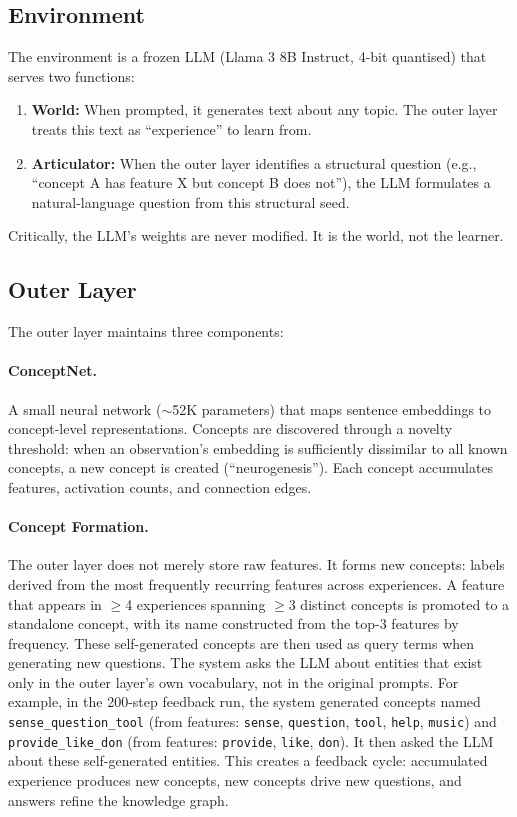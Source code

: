 \documentclass[conference]{IEEEtran}
\begin{document}
\subsection{Environment}

The environment is a frozen LLM (Llama 3 8B Instruct, 4-bit quantised) that serves two functions:

\begin{enumerate}[leftmargin=*]
\item \textbf{World:} When prompted, it generates text about any topic. The outer layer treats this text as ``experience'' to learn from.
\item \textbf{Articulator:} When the outer layer identifies a structural question (e.g., ``concept A has feature X but concept B does not''), the LLM formulates a natural-language question from this structural seed.
\end{enumerate}

Critically, the LLM's weights are never modified. It is the world, not the learner.

\subsection{Outer Layer}

The outer layer maintains three components:

\paragraph{ConceptNet.} A small neural network ($\sim$52K parameters) that maps sentence embeddings to concept-level representations. Concepts are discovered through a novelty threshold: when an observation's embedding is sufficiently dissimilar to all known concepts, a new concept is created (``neurogenesis''). Each concept accumulates features, activation counts, and connection edges.

\paragraph{Concept Formation.} The outer layer does not merely store raw features. It forms new concepts: labels derived from the most frequently recurring features across experiences. A feature that appears in $\geq$4 experiences spanning $\geq$3 distinct concepts is promoted to a standalone concept, with its name constructed from the top-3 features by frequency. These self-generated concepts are then used as query terms when generating new questions. The system asks the LLM about entities that exist only in the outer layer's own vocabulary, not in the original prompts. For example, in the 200-step feedback run, the system generated concepts named \texttt{sense\_question\_tool} (from features: \texttt{sense}, \texttt{question}, \texttt{tool}, \texttt{help}, \texttt{music}) and \texttt{provide\_like\_don} (from features: \texttt{provide}, \texttt{like}, \texttt{don}). It then asked the LLM about these self-generated entities. This creates a feedback cycle: accumulated experience produces new concepts, new concepts drive new questions, and answers refine the knowledge graph.
\end{document}
